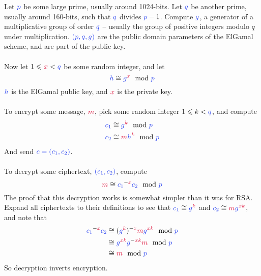 	Let $\blue{p}$ be some large prime, usually around 1024-bits. Let $\blue{q}$ be another prime, usually around 160-bits, such that $\blue{q}$ divides $\blue{p}-1$. Compute $\blue{g}$, a generator of a multiplicative group of order $\blue{q}$ -- usually the group of positive integers modulo $q$ under multiplication. $\blue{(p,q,g)}$ are the public domain parameters of the ElGamal scheme, and are part of the public key.\\
\\
	Now let $1 \leqslant \red{x} < \blue{q}$ be some random integer, and let
	$$
		\blue{h} \cong \blue{g}^\red{x} \mod \blue{p}
	$$
	$\blue{h}$ is the ElGamal public key, and $\red{x}$ is the private key.\\
\\
	To encrypt some message, $\red{m}$, pick some random integer $1 \leqslant k < \blue{q}$, and compute
	\begin{align*}
		\blue{c_1} &\cong \blue{g}^\red{k} \mod \blue{p}\\
		\blue{c_2} &\cong \red{m}\blue{h}^\red{k} \mod \blue{p}
	\end{align*}
	And send $\blue{c = (c_1,c_2)}$.\\
\\
	To decrypt some ciphertext, $\blue{(c_1,c_2)}$, compute
	$$
		\red{m} \cong \blue{c_1}^{-\red{x}}\blue{c_2} \mod \blue{p}
	$$
	The proof that this decryption works is somewhat simpler than it was for RSA. Expand all ciphertexts to their definitions to see that $\blue{c_1} \cong \blue{g}^\red{k}$ and $\blue{c_2} \cong \red{m}\blue{g}^{\red{xk}}$, and note that
	\begin{align*}
		 \blue{c_1}^{-\red{x}}\blue{c_2}
	&\cong (\blue{g}^\red{k})^{-\red{x}}\red{m}\blue{g}^\red{xk} \mod \blue{p} \\
	&\cong \blue{g}^{\red{xk}}\blue{g}^{-\red{xk}}\red{m} \mod \blue{p} \\
	&\cong \red{m} \mod \blue{p}
	\end{align*}
	So decryption inverts encryption.\\\vspace{5mm}
\\

